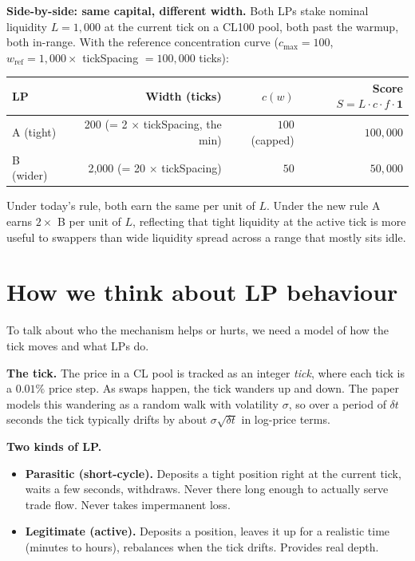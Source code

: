 \documentclass[11pt,a4paper]{article}
\begin{document}
\begin{example}
\textbf{Side-by-side: same capital, different width.} Both LPs stake nominal liquidity $L = 1{,}000$ at the current tick on a CL100 pool, both past the warmup, both in-range. With the reference concentration curve ($c_{\max} = 100$, $w_{\text{ref}} = 1{,}000 \times$ tickSpacing $= 100{,}000$ ticks):

\begin{center}
\small
\begin{tabular}{@{}lrrr@{}}
\toprule
LP & Width (ticks) & $c(w)$ & Score $S = L \cdot c \cdot f \cdot \mathbf{1}$ \\
\midrule
A (tight) & 200 (= 2 $\times$ tickSpacing, the min) & $100$ (capped) & $100{,}000$ \\
B (wider) & 2{,}000 (= 20 $\times$ tickSpacing) & $50$ & $50{,}000$ \\
\bottomrule
\end{tabular}
\end{center}

Under today's rule, both earn the same per unit of $L$. Under the new rule A earns $2\times$ B per unit of $L$, reflecting that tight liquidity at the active tick is more useful to swappers than wide liquidity spread across a range that mostly sits idle.
\end{example}

\section{How we think about LP behaviour}

To talk about who the mechanism helps or hurts, we need a model of how the tick moves and what LPs do.

\textbf{The tick.} The price in a CL pool is tracked as an integer \emph{tick}, where each tick is a $0.01\%$ price step. As swaps happen, the tick wanders up and down. The paper models this wandering as a random walk with volatility $\sigma$, so over a period of $\delta t$ seconds the tick typically drifts by about $\sigma\sqrt{\delta t}$ in log-price terms.

\textbf{Two kinds of LP.}

\begin{itemize}[leftmargin=2em]
\item \textbf{Parasitic (short-cycle).} Deposits a tight position right at the current tick, waits a few seconds, withdraws. Never there long enough to actually serve trade flow. Never takes impermanent loss.
\item \textbf{Legitimate (active).} Deposits a position, leaves it up for a realistic time (minutes to hours), rebalances when the tick drifts. Provides real depth.
\end{itemize}
\end{document}
